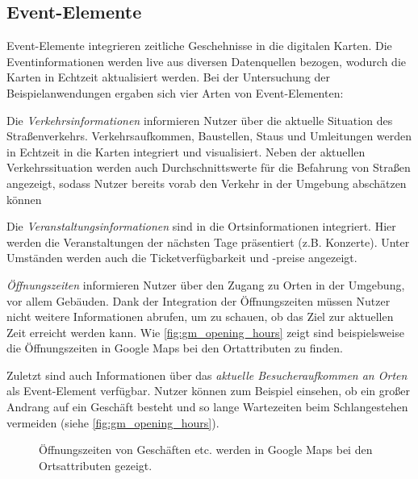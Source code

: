 \subsection{Event-Elemente}
\label{ssec:event-elements}
Event-Elemente integrieren zeitliche Geschehnisse in die digitalen Karten.
Die Eventinformationen werden live aus diversen Datenquellen bezogen, wodurch die Karten in Echtzeit aktualisiert werden.
Bei der Untersuchung der Beispielanwendungen ergaben sich vier Arten von Event-Elementen:

Die \emph{Verkehrsinformationen} informieren Nutzer über die aktuelle Situation des Straßenverkehrs.
Verkehrsaufkommen, Baustellen, Staus und Umleitungen werden in Echtzeit in die Karten integriert und visualisiert.
Neben der aktuellen Verkehrssituation werden auch Durchschnittswerte für die Befahrung von Straßen angezeigt, sodass Nutzer bereits vorab den Verkehr in der Umgebung abschätzen können

Die \emph{Veranstaltungsinformationen} sind in die Ortsinformationen integriert.
Hier werden die Veranstaltungen der nächsten Tage präsentiert (z.B. Konzerte).
Unter Umständen werden auch die Ticketverfügbarkeit und -preise angezeigt.

\emph{Öffnungszeiten} informieren Nutzer über den Zugang zu Orten in der Umgebung, vor allem Gebäuden.
Dank der Integration der Öffnungszeiten müssen Nutzer nicht weitere Informationen abrufen, um zu schauen, ob das Ziel zur aktuellen Zeit erreicht werden kann.
Wie \autoref{fig:gm_opening_hours} zeigt sind beispielsweise die Öffnungszeiten in Google Maps bei den Ortattributen zu finden.

Zuletzt sind auch Informationen über das \emph{aktuelle Besucheraufkommen an Orten} als Event-Element verfügbar.
Nutzer können zum Beispiel einsehen, ob ein großer Andrang auf ein Geschäft besteht und so lange Wartezeiten beim Schlangestehen vermeiden (siehe \autoref{fig:gm_opening_hours}).

\begin{figure}
	\centering
	\caption{Öffnungszeiten von Geschäften etc. werden in Google Maps bei den Ortsattributen gezeigt.}
	\label{fig:gm_opening_hours}
\end{figure}


